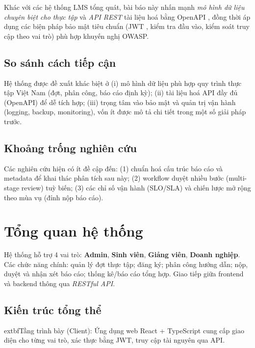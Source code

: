 \documentclass[conference]{IEEEtran}
\begin{document}
Khác với các hệ thống LMS tổng quát, bài báo này nhấn mạnh \textit{mô hình dữ liệu chuyên biệt cho thực tập} và \textit{API REST} tài liệu hoá bằng OpenAPI \cite{openapi}, đồng thời áp dụng các biện pháp bảo mật tiêu chuẩn (JWT \cite{jwt}, kiểm tra đầu vào, kiểm soát truy cập theo vai trò) phù hợp khuyến nghị OWASP.

\subsection{So sánh cách tiếp cận}
Hệ thống được đề xuất khác biệt ở (i) mô hình dữ liệu phù hợp quy trình thực tập Việt Nam (đợt, phân công, báo cáo định kỳ); (ii) tài liệu hoá API đầy đủ (OpenAPI) để dễ tích hợp; (iii) trọng tâm vào bảo mật và quản trị vận hành (logging, backup, monitoring), vốn ít được mô tả chi tiết trong một số giải pháp trước.

\subsection{Khoảng trống nghiên cứu}
Các nghiên cứu hiện có ít đề cập đến: (1) chuẩn hoá cấu trúc báo cáo và metadata để khai thác phân tích sau này; (2) workflow duyệt nhiều bước (multi-stage review) tuỳ biến; (3) các chỉ số vận hành (SLO/SLA) và chiến lược mở rộng theo mùa vụ (đỉnh nộp báo cáo).

\section{Tổng quan hệ thống}
Hệ thống hỗ trợ 4 vai trò: \textbf{Admin}, \textbf{Sinh viên}, \textbf{Giảng viên}, \textbf{Doanh nghiệp}. Các chức năng chính: quản lý đợt thực tập; đăng ký; phân công hướng dẫn; nộp, duyệt và nhận xét báo cáo; thống kê/báo cáo tổng hợp. Giao tiếp giữa frontend và backend thông qua \textit{RESTful API}.


\subsection{Kiến trúc tổng thể}
	extbf{Tầng trình bày (Client)}: Ứng dụng web React + TypeScript cung cấp giao diện cho từng vai trò, xác thực bằng JWT, truy cập tài nguyên qua API.
\end{document}
